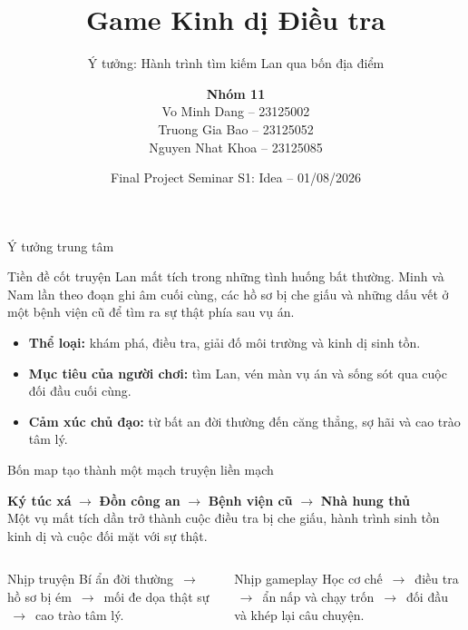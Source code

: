 \documentclass[aspectratio=169,10pt]{beamer}
\title{Game Kinh dị Điều tra}
\subtitle{Ý tưởng: Hành trình tìm kiếm Lan qua bốn địa điểm}
\author{\textbf{Nhóm 11}\\[0.25cm]\small
Vo Minh Dang -- 23125002\\
Truong Gia Bao -- 23125052\\
Nguyen Nhat Khoa -- 23125085}
\institute{Advanced Program (APCS) \\ 3D Visualization and Game Development -- 23TT}
\date{Final Project Seminar S1: Idea -- 01/08/2026}
\begin{document}
\begin{frame}
  \titlepage
\end{frame}

\begin{frame}{Ý tưởng trung tâm}
  \begin{block}{Tiền đề cốt truyện}
    Lan mất tích trong những tình huống bất thường. Minh và Nam lần theo đoạn ghi âm cuối cùng, các hồ sơ bị che giấu và những dấu vết ở một bệnh viện cũ để tìm ra sự thật phía sau vụ án.
  \end{block}

  \vspace{0.35cm}
  \begin{itemize}
    \item \textbf{Thể loại:} khám phá, điều tra, giải đố môi trường và kinh dị sinh tồn.
    \item \textbf{Mục tiêu của người chơi:} tìm Lan, vén màn vụ án và sống sót qua cuộc đối đầu cuối cùng.
    \item \textbf{Cảm xúc chủ đạo:} từ bất an đời thường đến căng thẳng, sợ hãi và cao trào tâm lý.
  \end{itemize}
\end{frame}

\begin{frame}{Bốn map tạo thành một mạch truyện liền mạch}
  \begin{center}
    \colorbox{GameLight}{\parbox{0.92\linewidth}{\centering\large
      \textbf{Ký túc xá} \quad$\longrightarrow$\quad
      \textbf{Đồn công an} \quad$\longrightarrow$\quad
      \textbf{Bệnh viện cũ} \quad$\longrightarrow$\quad
      \textbf{Nhà hung thủ}\\[0.25cm]
      Một vụ mất tích dần trở thành cuộc điều tra bị che giấu, hành trình sinh tồn kinh dị và cuộc đối mặt với sự thật.}}
  \end{center}

  \vspace{0.35cm}
  \begin{columns}[T,onlytextwidth]
    \begin{block}{Nhịp truyện}
      Bí ẩn đời thường \,$\rightarrow$\, hồ sơ bị ém \,$\rightarrow$\, mối đe dọa thật sự \,$\rightarrow$\, cao trào tâm lý.
    \end{block}
    \begin{block}{Nhịp gameplay}
      Học cơ chế \,$\rightarrow$\, điều tra \,$\rightarrow$\, ẩn nấp và chạy trốn \,$\rightarrow$\, đối đầu và khép lại câu chuyện.
    \end{block}
  \end{columns}
\end{frame}
\end{document}
